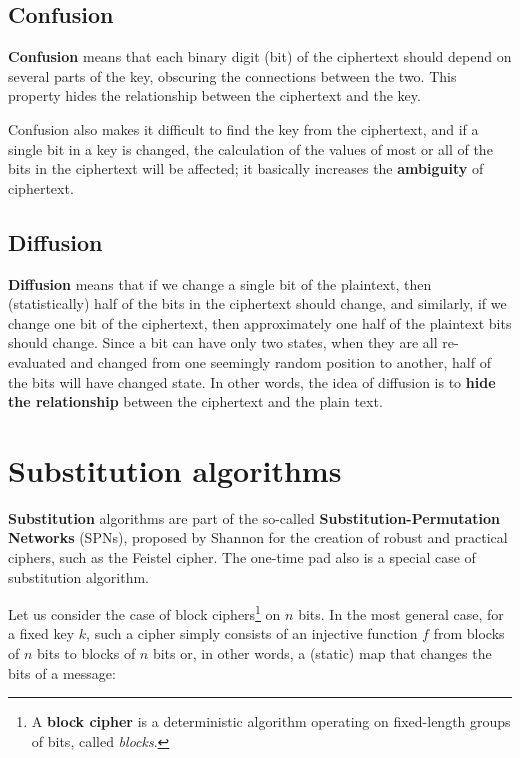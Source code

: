 \subsection*{Confusion}
\textbf{Confusion} means that each binary digit (bit) of the ciphertext should depend on several parts of the key, obscuring the connections between the two. This property hides the relationship between the ciphertext and the key.

Confusion also makes it difficult to find the key from the ciphertext, and if a single bit in a key is changed, the calculation of the values of most or all of the bits in the ciphertext will be affected; it basically increases the \textbf{ambiguity} of ciphertext.


\subsection*{Diffusion}
\textbf{Diffusion} means that if we change a single bit of the plaintext, then (statistically) half of the bits in the ciphertext should change, and similarly, if we change one bit of the ciphertext, then approximately one half of the plaintext bits should change. Since a bit can have only two states, when they are all re-evaluated and changed from one seemingly random position to another, half of the bits will have changed state. In other words, the idea of diffusion is to \textbf{hide the relationship} between the ciphertext and the plain text.


\section{Substitution algorithms}
\textbf{Substitution} algorithms are part of the so-called \textbf{Substitution-Permutation Networks} (SPNs), proposed by Shannon for the creation of robust and practical ciphers, such as the Feistel cipher. The one-time pad also is a special case of substitution algorithm.

Let us consider the case of block ciphers\footnote{A \textbf{block cipher} is a deterministic algorithm operating on fixed-length groups of bits, called \textit{blocks}.} on $n$ bits. In the most general case, for a fixed key $k$, such a cipher simply consists of an injective function $f$ from blocks of $n$ bits to blocks of $n$ bits or, in other words, a (static) map that changes the bits of a message:

